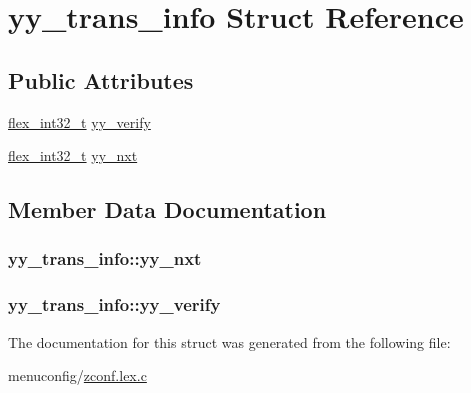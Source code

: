 \hypertarget{structyy__trans__info}{\section{yy\-\_\-trans\-\_\-info Struct Reference}
\label{structyy__trans__info}
}
\subsection*{Public Attributes}
\begin{DoxyCompactItemize}
\item 
\hyperlink{zconf_8lex_8c_a838ce943cf44ef7769480714fc6c3ba9}{flex\-\_\-int32\-\_\-t} \hyperlink{structyy__trans__info_a5c9f61e770deef50bd4e697310342fe9}{yy\-\_\-verify}
\item 
\hyperlink{zconf_8lex_8c_a838ce943cf44ef7769480714fc6c3ba9}{flex\-\_\-int32\-\_\-t} \hyperlink{structyy__trans__info_ae0715250c2bef261e596e77e0030f13e}{yy\-\_\-nxt}
\end{DoxyCompactItemize}


\subsection{Member Data Documentation}
\hypertarget{structyy__trans__info_ae0715250c2bef261e596e77e0030f13e}{
\subsubsection[{yy\-\_\-nxt}]{ yy\-\_\-trans\-\_\-info\-::yy\-\_\-nxt}}\label{structyy__trans__info_ae0715250c2bef261e596e77e0030f13e}
\hypertarget{structyy__trans__info_a5c9f61e770deef50bd4e697310342fe9}{
\subsubsection[{yy\-\_\-verify}]{ yy\-\_\-trans\-\_\-info\-::yy\-\_\-verify}}\label{structyy__trans__info_a5c9f61e770deef50bd4e697310342fe9}


The documentation for this struct was generated from the following file\-:\begin{DoxyCompactItemize}
\item 
menuconfig/\hyperlink{zconf_8lex_8c}{zconf.\-lex.\-c}\end{DoxyCompactItemize}
